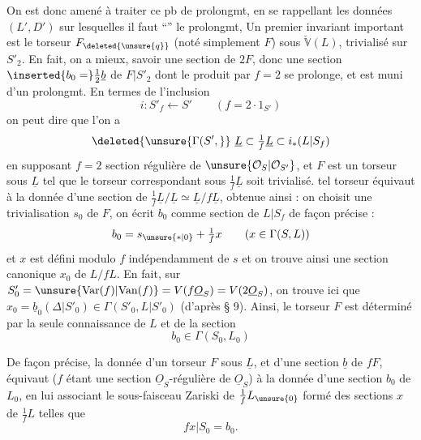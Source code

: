 On est donc amené  à traiter ce pb de prolongmt, en se rappellant les données $(L',D')$ sur lesquelles il faut ``'' le prolongmt,  Un premier invariant important est le torseur $F_{\deleted{\unsure{q}}}$ (noté simplement $F$) sous $\check{\mathbb V}(L)$, trivialisé sur $S'_2$. En fait, on a mieux, savoir une section  de $2F$, donc une section $\inserted{b_0=}\frac12\underline b$ de $F|S'_2$  dont le produit par $f=2$ se prolonge, et est muni d'un prolongmt. En termes de l'inclusion
\[i:S'_f\longleftarrow S'\qquad(f=2\cdot1_{S'})\]
on peut dire que l'on a
\[\deleted{\unsure{\Gamma(S',}}\ \underline L\subset\tfrac1f\underline L\subset i_*(L|S_f)\]
en supposant $f=2$ section régulière de $\unsure{\mathcal O_S|\mathcal O_{S'}}$, et $F$ est un torseur sous $\underline L$ tel que le torseur correspondant sous $\frac1f\underline L$ soit trivialisé.   tel torseur  équivaut à la donnée d'une section de $\frac1f\underline L/\underline L\simeq\underline L/f\underline L$,  obtenue ainsi : on choisit  une trivialisation  $s_0$ de $F$, on écrit $b_0$ comme section de $L|S_f$ de façon précise :
\[b_0=s_{\unsure{*|0}}+\tfrac1f x\qquad(x\in\Gamma(S,L))\]
et $x$ est défini modulo $f$ indépendamment de $s$ et on trouve ainsi une section canonique $x_0$ de $L/fL$. En fait,  sur $S'_0=\unsure{\mathrm{Var}(f)|\mathrm{Van}(f)}=V(f\underline O_S)=V(2\underline O_S)$, on trouve ici que $x_0=\underline b_{0}(\Delta|S'_0)\in\Gamma(S'_0,L|S'_0)$ (d'après § 9). Ainsi, le torseur $F$ est déterminé  par la seule connaissance de  $L$ et de la section
\[b_0\in\Gamma(S_0,L_0)\tag*{(105)}\]

De façon précise, la donnée d'un torseur $F$ sous $\underline L$, et d'une section $\underline b$ de $fF$, équivaut  ($f$ étant une section $\underline O_S$-régulière de $\underline O_S$) à la donnée d'une section $b_0$ de $L_0$, en lui associant le  sous-faisceau Zariski de $\frac1f L_{\unsure{0}}$ formé des sections  $x$ de $\frac1f L$ telles que
\[fx|S_0=b_0.\]

